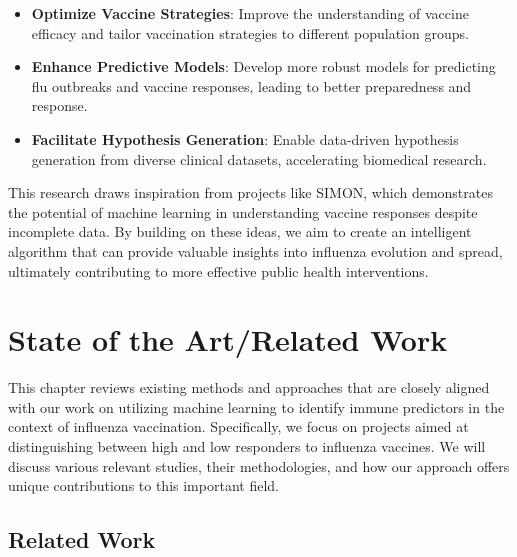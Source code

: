 \documentclass[runningheads,a4paper,11pt]{report}
\begin{document}
\begin{itemize}
    \item \textbf{Optimize Vaccine Strategies}: Improve the understanding of vaccine efficacy and tailor vaccination strategies to different population groups.
    \item \textbf{Enhance Predictive Models}: Develop more robust models for predicting flu outbreaks and vaccine responses, leading to better preparedness and response.
    \item \textbf{Facilitate Hypothesis Generation}: Enable data-driven hypothesis generation from diverse clinical datasets, accelerating biomedical research.
\end{itemize}
This research draws inspiration from projects like SIMON, which demonstrates the potential of machine learning in understanding vaccine responses despite incomplete data. By building on these ideas, we aim to create an intelligent algorithm that can provide valuable insights into influenza evolution and spread, ultimately contributing to more effective public health interventions.

 




\chapter{State of the Art/Related Work}
\label{chapter:stateOfArt}

This chapter reviews existing methods and approaches that are closely aligned with our work on utilizing machine learning to identify immune predictors in the context of influenza vaccination. Specifically, we focus on projects aimed at distinguishing between high and low responders to influenza vaccines. We will discuss various relevant studies, their methodologies, and how our approach offers unique contributions to this important field.

\section{Related Work}
\end{document}
